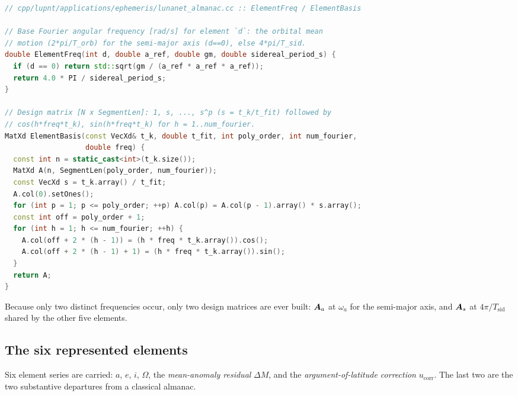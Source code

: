 \begin{lstlisting}[language=cpp, caption={Element-specific base frequency and the element design matrix, \code{cpp/lupnt/applications/ephemeris/lunanet\_almanac.cc}.}, label={lst:eph-alm-basis}]
// cpp/lupnt/applications/ephemeris/lunanet_almanac.cc :: ElementFreq / ElementBasis

// Base Fourier angular frequency [rad/s] for element `d`: the orbital mean
// motion (2*pi/T_orb) for the semi-major axis (d==0), else 4*pi/T_sid.
double ElementFreq(int d, double a_ref, double gm, double sidereal_period_s) {
  if (d == 0) return std::sqrt(gm / (a_ref * a_ref * a_ref));
  return 4.0 * PI / sidereal_period_s;
}

// Design matrix [N x SegmentLen]: 1, s, ..., s^p (s = t_k/t_fit) followed by
// cos(h*freq*t_k), sin(h*freq*t_k) for h = 1..num_fourier.
MatXd ElementBasis(const VecXd& t_k, double t_fit, int poly_order, int num_fourier,
                   double freq) {
  const int n = static_cast<int>(t_k.size());
  MatXd A(n, SegmentLen(poly_order, num_fourier));
  const VecXd s = t_k.array() / t_fit;
  A.col(0).setOnes();
  for (int p = 1; p <= poly_order; ++p) A.col(p) = A.col(p - 1).array() * s.array();
  const int off = poly_order + 1;
  for (int h = 1; h <= num_fourier; ++h) {
    A.col(off + 2 * (h - 1)) = (h * freq * t_k.array()).cos();
    A.col(off + 2 * (h - 1) + 1) = (h * freq * t_k.array()).sin();
  }
  return A;
}
\end{lstlisting}

Because only two distinct frequencies occur, only two design matrices are ever
built: $\bm{A}_a$ at $\omega_a$ for the semi-major axis, and $\bm{A}_s$ at
$4\pi/T_\mathrm{sid}$ shared by the other five elements.

\subsection{The six represented elements}

Six element series are carried: $a$, $e$, $i$, $\Omega$, the \emph{mean-anomaly
residual} $\Delta M$, and the \emph{argument-of-latitude correction}
$u_\mathrm{corr}$. The last two are the two substantive departures from a
classical almanac.

